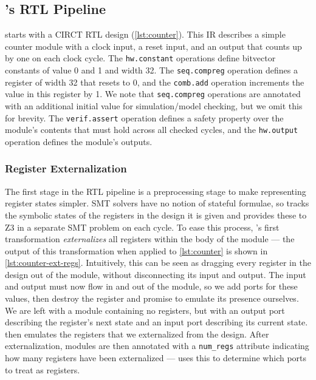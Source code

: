 \documentclass[acmsmall,screen,review]{acmart}
\begin{document}
\subsection{\toolname{}'s RTL Pipeline}
\toolname{} starts with a CIRCT RTL design (\autoref{lst:counter}).
This IR describes a simple counter module with a clock input, a reset input, and an output that counts up by one on each clock cycle.
The \texttt{hw.constant} operations define bitvector constants of value 0 and 1 and width 32.
The \texttt{seq.compreg} operation defines a register of width 32 that resets to 0, and the \texttt{comb.add} operation increments the value in this register by 1.
We note that \texttt{seq.compreg} operations are annotated with an additional initial value for simulation/model checking, but we omit this for brevity.
The \texttt{verif.assert} operation defines a safety property over the module's contents that must hold across all checked cycles, and the \texttt{hw.output} operation defines the module's outputs.


\subsubsection{Register Externalization}
The first stage in the RTL pipeline is a preprocessing stage to make representing register states simpler.
SMT solvers have no notion of stateful formulae, so \toolname{} tracks the symbolic states of the registers in the design it is given and provides these to Z3 in a separate SMT problem on each cycle.
To ease this process, \toolname{}'s first transformation \textit{externalizes} all registers within the body of the module --- the output of this transformation when applied to \autoref{lst:counter} is shown in \autoref{lst:counter-ext-regs}.
Intuitively, this can be seen as dragging every register in the design out of the module, without disconnecting its input and output.
The input and output must now flow in and out of the module, so we add ports for these values, then destroy the register and promise to emulate its presence ourselves.
We are left with a module containing no registers, but with an output port describing the register's next state and an input port describing its current state.
\toolname{} then emulates the registers that we externalized from the design.
After externalization, modules are then annotated with a \texttt{num\_regs} attribute indicating how many registers have been externalized --- \toolname{} uses this to determine which ports to treat as registers.
\end{document}
